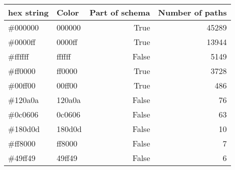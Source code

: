 \begin{tabular}{llrr}
\toprule
hex string & Color & Part of schema & Number of paths \\
\midrule
\#000000 & \cellcolor{000000}\color{000000}000000 & True & 45289 \\
\#0000ff & \cellcolor{0000ff}\color{0000ff}0000ff & True & 13944 \\
\#ffffff & \cellcolor{ffffff}\color{ffffff}ffffff & False & 5149 \\
\#ff0000 & \cellcolor{ff0000}\color{ff0000}ff0000 & True & 3728 \\
\#00ff00 & \cellcolor{00ff00}\color{00ff00}00ff00 & True & 486 \\
\#120a0a & \cellcolor{120a0a}\color{120a0a}120a0a & False & 76 \\
\#0c0606 & \cellcolor{0c0606}\color{0c0606}0c0606 & False & 63 \\
\#180d0d & \cellcolor{180d0d}\color{180d0d}180d0d & False & 10 \\
\#ff8000 & \cellcolor{ff8000}\color{ff8000}ff8000 & False & 7 \\
\#49ff49 & \cellcolor{49ff49}\color{49ff49}49ff49 & False & 6 \\
\bottomrule
\end{tabular}
